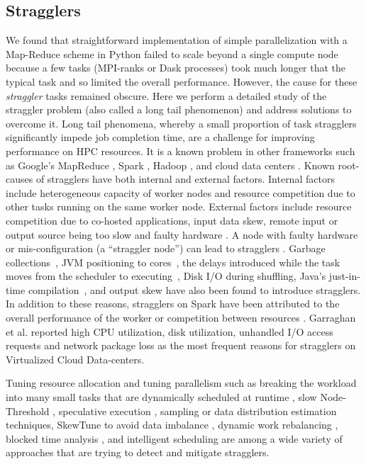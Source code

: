 \label{background}

\subsection{Stragglers}
\label{sec:stragglers}

We found that straightforward implementation of simple parallelization with a Map-Reduce scheme in Python failed to scale beyond a single compute node \cite{Khoshlessan:2017ab} because a few tasks (MPI-ranks or Dask \citep{Rocklin:2015aa} processes) took much longer that the typical task and so limited the overall performance.
However, the cause for these \emph{straggler} tasks remained obscure.
Here we perform a detailed study of the straggler problem (also called a long tail phenomenon) and address solutions to overcome it.
Long tail phenomena, whereby a small proportion of task stragglers significantly impede job completion time, are a challenge for improving performance \cite{Garraghan2016} on HPC resources.
It is a known problem in other frameworks such as Google's MapReduce \cite{Dean2004}, Spark \cite{Kyong2017,Ousterhout2017,Gittens2016}, Hadoop \cite{Dean2004}, and cloud data centers \cite{Schmidt2016}. Known root-causes of stragglers have both internal and external factors. 
Internal factors include heterogeneous capacity of worker nodes and resource competition due to other tasks running on the same worker node. 
External factors include resource competition due to co-hosted applications, input data skew, remote input or output source being too slow and faulty hardware \cite{Chen2014}.
A node with faulty hardware or mis-configuration (a ``straggler node'') can lead to stragglers \cite{Dean2004}. 
Garbage collections~\cite{Kyong2017,Ousterhout2017}, JVM positioning to cores~\cite{Kyong2017}, the delays introduced while the task moves from the scheduler to executing~\cite{Gittens2016}, Disk I/O during shuffling, Java's just-in-time compilation~\cite{Ousterhout2017}, and output skew \cite{Ousterhout2017} have also been found to introduce stragglers.
In addition to these reasons, stragglers on Spark have been attributed to the overall performance of the worker or competition between resources \cite{Yang2016}.
Garraghan et al. \cite{Garraghan2016} reported high CPU utilization, disk utilization, unhandled I/O access requests and network package loss as the most frequent reasons for stragglers on Virtualized Cloud Data-centers.

Tuning resource allocation and tuning parallelism such as breaking the workload into many small tasks that are dynamically scheduled at runtime \cite{Rosen2012}, slow Node-Threshold \cite{Dean2004}, speculative execution \cite{Dean2004}, sampling or data distribution estimation techniques, SkewTune to avoid data imbalance \cite{Kwon2012}, dynamic work rebalancing \cite{Schmidt2016}, blocked time analysis \cite{Ousterhout2015}, and intelligent scheduling \cite{AWE-WQ2014} are among a wide variety of approaches that are trying to detect and mitigate stragglers. 

